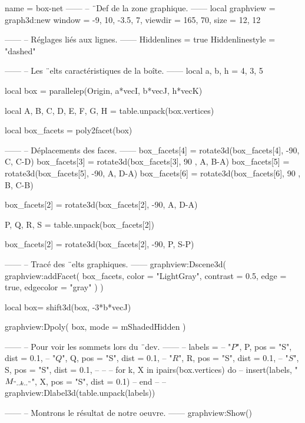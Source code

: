 \documentclass{standalone}
\begin{document}
\begin{luadraw}{name = box-net}
------
-- ¨Def de la zone graphique.
------
local graphview = graph3d:new{
  window  = {-9, 10, -3.5, 7},
  viewdir = {165, 70},
  size    = {12, 12}
}

------
-- Réglages liés aux lignes.
------
Hiddenlines     = true
Hiddenlinestyle = "dashed"

------
-- Les ¨elts caractéristiques de la boîte.
------
local a, b, h = 4, 3, 5

local box = parallelep(Origin, a*vecI, b*vecJ, h*vecK)

local A, B, C, D, E, F, G, H = table.unpack(box.vertices)

local box_facets = poly2facet(box)

------
-- Déplacements des faces.
------
box_facets[4] = rotate3d(box_facets[4], -90, {C, C-D})
box_facets[3] = rotate3d(box_facets[3], 90 , {A, B-A})
box_facets[5] = rotate3d(box_facets[5], -90, {A, D-A})
box_facets[6] = rotate3d(box_facets[6], 90 , {B, C-B})

box_facets[2] = rotate3d(box_facets[2], -90, {A, D-A})

P, Q, R, S = table.unpack(box_facets[2])

box_facets[2] = rotate3d(box_facets[2], -90, {P, S-P})

------
-- Tracé des ¨elts graphiques.
------
graphview:Dscene3d(
  graphview:addFacet(
    box_facets,
    {
      color     = "LightGray",
      contrast  = 0.5,
      edge      = true,
      edgecolor = "gray"
    }
  )
)

local box= shift3d(box, -3*b*vecJ)

graphview:Dpoly(
  box,
  {mode = mShadedHidden}
)

------
-- Pour voir les sommets lors du ¨dev.
------
-- labels = {
--   "$P$", P, {pos = "S", dist = 0.1},
--   "$Q$", Q, {pos = "S", dist = 0.1},
--   "$R$", R, {pos = "S", dist = 0.1},
--   "$S$", S, {pos = "S", dist = 0.1},
-- }
--
-- for k, X in ipairs(box.vertices) do
--   insert(labels, {"$M_{".. k .."}$", X, {pos = "S", dist = 0.1}})
-- end
--
-- graphview:Dlabel3d(table.unpack(labels))

------
-- Montrons le résultat de notre oeuvre.
------
graphview:Show()
\end{luadraw}
\end{document}
